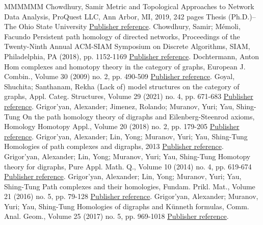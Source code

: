 \begin{thebibliography}{MMMMMM}
 Chowdhury, Samir Metric and Topological Approaches to Network Data Analysis, ProQuest LLC, Ann Arbor, MI, 2019, 242 pages Thesis (Ph.D.)–The Ohio State University \href{https://alco.centre-mersenne.org/articles/10.5802/alco.341/#chowdhury}{Publisher reference}.
 Chowdhury, Samir; Mémoli, Facundo Persistent path homology of directed networks, Proceedings of the Twenty-Ninth Annual ACM-SIAM Symposium on Discrete Algorithms, SIAM, Philadelphia, PA (2018), pp. 1152-1169 \href{https://alco.centre-mersenne.org/articles/10.5802/alco.341/#chowdhury-memoli}{Publisher reference}.
 Dochtermann, Anton Hom complexes and homotopy theory in the category of graphs, European J. Combin., Volume 30 (2009) no. 2, pp. 490-509 \href{https://alco.centre-mersenne.org/articles/10.5802/alco.341/#dochtermann}{Publisher reference}.
 Goyal, Shuchita; Santhanam, Rekha (Lack of) model structures on the category of graphs, Appl. Categ. Structures, Volume 29 (2021) no. 4, pp. 671-683 \href{https://alco.centre-mersenne.org/articles/10.5802/alco.341/#goyal-santhanam}{Publisher reference}.
 Grigor’yan, Alexander; Jimenez, Rolando; Muranov, Yuri; Yau, Shing-Tung On the path homology theory of digraphs and Eilenberg-Steenrod axioms, Homology Homotopy Appl., Volume 20 (2018) no. 2, pp. 179-205 \href{https://alco.centre-mersenne.org/articles/10.5802/alco.341/#grigor'yan-jimenez-muranov-yau}{Publisher reference}.
 Grigor’yan, Alexander; Lin, Yong; Muranov, Yuri; Yau, Shing-Tung Homologies of path complexes and digraphs, 2013 \href{https://alco.centre-mersenne.org/articles/10.5802/alco.341/#grigor'yan-lin-muranov-yau:unpublished}{Publisher reference}.
 Grigor’yan, Alexander; Lin, Yong; Muranov, Yuri; Yau, Shing-Tung Homotopy theory for digraphs, Pure Appl. Math. Q., Volume 10 (2014) no. 4, pp. 619-674 \href{https://alco.centre-mersenne.org/articles/10.5802/alco.341/#grigor'yan-lin-muranov-yau:homotopy}{Publisher reference}.
 Grigor’yan, Alexander; Lin, Yong; Muranov, Yuri; Yau, Shing-Tung Path complexes and their homologies, Fundam. Prikl. Mat., Volume 21 (2016) no. 5, pp. 79-128 \href{https://alco.centre-mersenne.org/articles/10.5802/alco.341/#grigor'yan-lin-muranov-yau}{Publisher reference}.
 Grigor’yan, Alexander; Muranov, Yuri; Yau, Shing-Tung Homologies of digraphs and Künneth formulas, Comm. Anal. Geom., Volume 25 (2017) no. 5, pp. 969-1018 \href{https://alco.centre-mersenne.org/articles/10.5802/alco.341/#grigor'yan-muranov-yau}{Publisher reference}.

\end{thebibliography}
